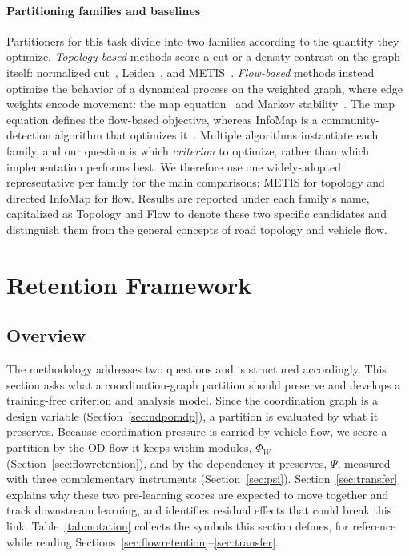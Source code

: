\documentclass[journal]{IEEEtran}
\theoremstyle{definition}
\begin{document}
\paragraph{Partitioning families and baselines} Partitioners for this task divide into two families according to the quantity they optimize. \emph{Topology-based} methods score a cut or a density contrast on the graph itself: normalized cut~\citep{shimalik2000}, Leiden~\citep{traag2019leiden,traag2011cpm}, and METIS~\citep{karypis1998metis}. \emph{Flow-based} methods instead optimize the behavior of a dynamical process on the weighted graph, where edge weights encode movement: the map equation~\citep{rosvall2008maps} and Markov stability~\citep{delvenne2010stability,lambiotte2014multiscale}. The map equation defines the flow-based objective, whereas InfoMap is a community-detection algorithm that optimizes it~\citep{edler2023community}. Multiple algorithms instantiate each family, and our question is which \emph{criterion} to optimize, rather than which implementation performs best. We therefore use one widely-adopted representative per family for the main comparisons: METIS for topology and directed InfoMap for flow. Results are reported under each family's name, capitalized as Topology and Flow to denote these two specific candidates and distinguish them from the general concepts of road topology and vehicle flow.
\section{Retention Framework}
\label{sec:method}

\subsection{Overview}
\label{sec:overview}

The methodology addresses two questions and is structured accordingly. This section asks what a coordination-graph partition should preserve and develops a training-free criterion and analysis model.
Since the coordination graph is a design variable (Section~\ref{sec:ndpomdp}), a partition is evaluated by what it preserves. Because coordination pressure is carried by vehicle flow, we score a partition by the OD flow it keeps within modules, $\Phi_W$ (Section~\ref{sec:flowretention}), and by the dependency it preserves, $\Psi$, measured with three complementary instruments (Section~\ref{sec:psi}). Section~\ref{sec:transfer} explains why these two pre-learning scores are expected to move together and track downstream learning, and identifies residual effects that could break this link.
Table~\ref{tab:notation} collects the symbols this section defines, for reference while reading Sections~\ref{sec:flowretention}--\ref{sec:transfer}.
\end{document}
